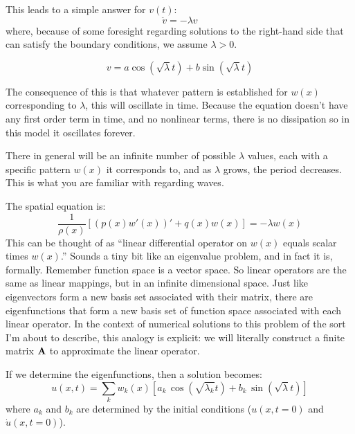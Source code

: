 This leads to a simple answer for $v(t)$:
\begin{equation}
\ddot{v} = - \lambda v
\end{equation}
where, because of some foresight regarding solutions to the right-hand
side that can satisfy the boundary conditions, we assume $\lambda>0$.


\begin{answer}
\begin{equation}
v = a \cos(\sqrt{\lambda} t) + b \sin(\sqrt{\lambda} t)
\end{equation}

The consequence of this is that whatever pattern is established for
$w(x)$ corresponding to $\lambda$, this will oscillate in
time. Because the equation doesn't have any first order term in time,
and no nonlinear terms, there is no dissipation so in this model it
oscillates forever.

There in general will be an infinite number of possible $\lambda$
values, each with a specific pattern $w(x)$ it corresponds to, and as
$\lambda$ grows, the period decreases. This is what you are familiar
with regarding waves.
\end{answer}

The spatial equation is:
\begin{equation}
\frac{1}{\rho(x)} \left[\left(p(x) w'(x)\right)' + q(x) w(x)\right] =
-\lambda w(x)
\end{equation}
This can be thought of as ``linear differential operator on $w(x)$
equals scalar times $w(x)$.'' Sounds a tiny bit like an eigenvalue
problem, and in fact it is, formally. Remember function space is a
vector space. So linear operators are the same as linear mappings, but
in an infinite dimensional space. Just like eigenvectors form a new
basis set associated with their matrix, there are eigenfunctions  that
form a new basis set of function space associated with each linear
operator. In the context of numerical solutions to this problem of the
sort I'm about to describe, this analogy is explicit: we will
literally construct a finite matrix ${\bf A}$ to approximate the
linear operator.

If we determine the eigenfunctions, then a solution becomes:
\begin{equation}
u(x,t) = \sum_{k} w_k(x) \left[ a_k\, \cos(\sqrt{\lambda_k} t) + b_k\,
  \sin(\sqrt{\lambda} t) \right]
\end{equation}
where $a_k$ and $b_k$ are determined by the initial conditions
($u(x, t=0)$ and $\dot{u}(x, t=0)$).

